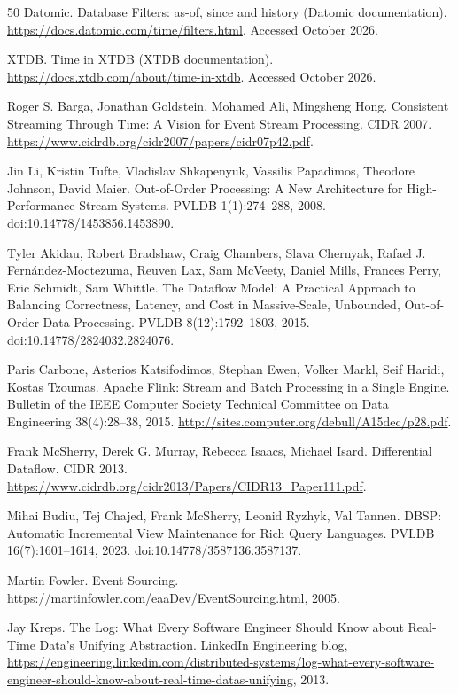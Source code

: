 \documentclass[sigconf, nonacm]{acmart}
\begin{document}
\begin{thebibliography}{50}
Datomic. Database Filters: as-of, since and history (Datomic documentation). \url{https://docs.datomic.com/time/filters.html}. Accessed October 2026.

XTDB. Time in XTDB (XTDB documentation). \url{https://docs.xtdb.com/about/time-in-xtdb}. Accessed October 2026.

Roger S. Barga, Jonathan Goldstein, Mohamed Ali, Mingsheng Hong. Consistent Streaming Through Time: A Vision for Event Stream Processing. CIDR 2007. \url{https://www.cidrdb.org/cidr2007/papers/cidr07p42.pdf}.

Jin Li, Kristin Tufte, Vladislav Shkapenyuk, Vassilis Papadimos, Theodore Johnson, David Maier. Out-of-Order Processing: A New Architecture for High-Performance Stream Systems. PVLDB 1(1):274--288, 2008. doi:10.14778/1453856.1453890.

Tyler Akidau, Robert Bradshaw, Craig Chambers, Slava Chernyak, Rafael J. Fern\'andez-Moctezuma, Reuven Lax, Sam McVeety, Daniel Mills, Frances Perry, Eric Schmidt, Sam Whittle. The Dataflow Model: A Practical Approach to Balancing Correctness, Latency, and Cost in Massive-Scale, Unbounded, Out-of-Order Data Processing. PVLDB 8(12):1792--1803, 2015. doi:10.14778/2824032.2824076.

Paris Carbone, Asterios Katsifodimos, Stephan Ewen, Volker Markl, Seif Haridi, Kostas Tzoumas. Apache Flink: Stream and Batch Processing in a Single Engine. Bulletin of the IEEE Computer Society Technical Committee on Data Engineering 38(4):28--38, 2015. \url{http://sites.computer.org/debull/A15dec/p28.pdf}.

Frank McSherry, Derek G. Murray, Rebecca Isaacs, Michael Isard. Differential Dataflow. CIDR 2013. \url{https://www.cidrdb.org/cidr2013/Papers/CIDR13_Paper111.pdf}.

Mihai Budiu, Tej Chajed, Frank McSherry, Leonid Ryzhyk, Val Tannen. DBSP: Automatic Incremental View Maintenance for Rich Query Languages. PVLDB 16(7):1601--1614, 2023. doi:10.14778/3587136.3587137.

Martin Fowler. Event Sourcing. \url{https://martinfowler.com/eaaDev/EventSourcing.html}, 2005.

Jay Kreps. The Log: What Every Software Engineer Should Know about Real-Time Data's Unifying Abstraction. LinkedIn Engineering blog, \url{https://engineering.linkedin.com/distributed-systems/log-what-every-software-engineer-should-know-about-real-time-datas-unifying}, 2013.


\end{thebibliography}
\end{document}
